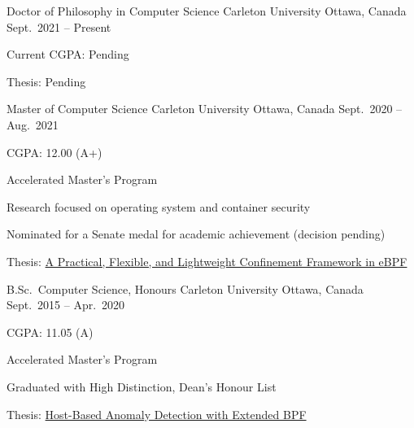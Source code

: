 

\begin{cventries}

  \cventry
    {Doctor of Philosophy in Computer Science} %
    {Carleton University} %
    {Ottawa, Canada} %
    {Sept.\ 2021 -- Present} %
    {
      \begin{cvitems} %
        \item {Current CGPA: Pending}
        \item {Thesis: Pending}
      \end{cvitems}
    }

  \cventry
    {Master of Computer Science} %
    {Carleton University} %
    {Ottawa, Canada} %
    {Sept.\ 2020 -- Aug.\ 2021} %
    {
      \begin{cvitems} %
        \item {CGPA: 12.00 (A+)}
        \item {Accelerated Master's Program}
        \item {Research focused on operating system and container security}
        \item {Nominated for a Senate medal for academic achievement (decision pending)}
        \item {Thesis: \href{https://www.cisl.carleton.ca/~will/written/techreport/mcs-thesis.pdf}
          {A Practical, Flexible, and Lightweight Confinement Framework in eBPF}}
      \end{cvitems}
    }

  \cventry
    {B.Sc.~Computer Science, Honours} %
    {Carleton University} %
    {Ottawa, Canada} %
    {Sept.~2015 -- Apr.~2020} %
    {
      \begin{cvitems} %
        \item {CGPA: 11.05 (A)}
        \item {Accelerated Master's Program}
        \item {Graduated with High Distinction, Dean's Honour List}
        \item {Thesis: \href{https://www.cisl.carleton.ca/~will/written/coursework/undergrad-ebpH-thesis.pdf}
          {Host-Based Anomaly Detection with Extended BPF}}
      \end{cvitems}
    }

\end{cventries}

